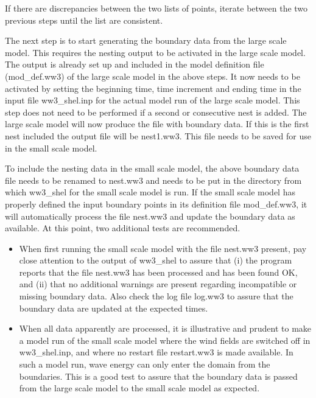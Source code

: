 \begin{list}{)}{
             \rightmargin 5mm 
              \leftmargin 10mm}
\item If there are discrepancies between the two lists of points, iterate
      between the two previous steps until the list are consistent.

\item The next step is to start generating the boundary data from the large
      scale model. This requires the nesting output to be activated in the
      large scale model. The output is already set up and included in the
      model definition file ({\file mod\_def.ww3}) of the large scale model in
      the above steps. It now needs to be activated by setting the beginning
      time, time increment and ending time in the input file {\file
      ww3\_shel.inp} for the actual model run of the large scale model. This
      step does not need to be performed if a second or consecutive nest is
      added. The large scale model will now produce the file with boundary
      data. If this is the first nest included the output file will be {\file
      nest1.ww3}. This file needs to be saved for use in the small scale
      model.

\item To include the nesting data in the small scale model, the above boundary
      data file needs to be renamed to {\file nest.ww3} and needs to be put in
      the directory from which {\file ww3\_shel} for the small scale model is
      run. If the small scale model has properly defined the input boundary
      points in its definition file {\file mod\_def.ww3}, it will
      automatically process the file {\file nest.ww3} and update the boundary
      data as available. At this point, two additional tests are recommended.

\begin{itemize}

\item When first running the small scale model with the file {\file nest.ww3}
      present, pay close attention to the output of {\code ww3\_shel} to
      assure that (i) the program reports that the file {\file nest.ww3} has
      been processed and has been found OK, and (ii) that no additional
      warnings are present regarding incompatible or missing boundary
      data. Also check the log file {\file log.ww3} to assure that the
      boundary data are updated at the expected times.

\item When all data apparently are processed, it is illustrative and prudent to
      make a model run of the small scale model where the wind fields are
      switched off in {\file ww3\_shel.inp}, and where no restart file {\file
      restart.ww3} is made available. In such a model run, wave energy can
      only enter the domain from the boundaries. This is a good test to assure
      that the boundary data is passed from the large scale model to the small
      scale model as expected.

\end{itemize}

\end{list}

